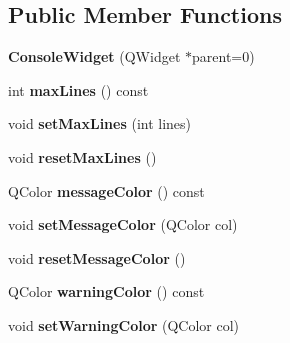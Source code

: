 \subsection*{Public Member Functions}
\begin{DoxyCompactItemize}
\item 
\hypertarget{class_console_widget_a4a66caaf3f7583a46ebe44a5c2221160}{{\bfseries Console\-Widget} (Q\-Widget $\ast$parent=0)}\label{class_console_widget_a4a66caaf3f7583a46ebe44a5c2221160}

\item 
\hypertarget{class_console_widget_a1e01a4e339ff6781cbfec5bd59c292f6}{int {\bfseries max\-Lines} () const }\label{class_console_widget_a1e01a4e339ff6781cbfec5bd59c292f6}

\item 
\hypertarget{class_console_widget_a5bb26af5e53e3025d31b40d8e284feb9}{void {\bfseries set\-Max\-Lines} (int lines)}\label{class_console_widget_a5bb26af5e53e3025d31b40d8e284feb9}

\item 
\hypertarget{class_console_widget_a58291752b182ad84572e36029c42e827}{void {\bfseries reset\-Max\-Lines} ()}\label{class_console_widget_a58291752b182ad84572e36029c42e827}

\item 
\hypertarget{class_console_widget_af9dfb729ec2a6973880d717d5b9c1c78}{Q\-Color {\bfseries message\-Color} () const }\label{class_console_widget_af9dfb729ec2a6973880d717d5b9c1c78}

\item 
\hypertarget{class_console_widget_a290f1f7d09a6fb2078cada80d6e8024c}{void {\bfseries set\-Message\-Color} (Q\-Color col)}\label{class_console_widget_a290f1f7d09a6fb2078cada80d6e8024c}

\item 
\hypertarget{class_console_widget_a899d2b558ccf3976e45514fd4bd9eb7c}{void {\bfseries reset\-Message\-Color} ()}\label{class_console_widget_a899d2b558ccf3976e45514fd4bd9eb7c}

\item 
\hypertarget{class_console_widget_af1abcb3bb2a6be074233e1891ecace91}{Q\-Color {\bfseries warning\-Color} () const }\label{class_console_widget_af1abcb3bb2a6be074233e1891ecace91}

\item 
\hypertarget{class_console_widget_aaf8789dc58ae736b951552b1fb9cef0d}{void {\bfseries set\-Warning\-Color} (Q\-Color col)}\label{class_console_widget_aaf8789dc58ae736b951552b1fb9cef0d}


\end{DoxyCompactItemize}
